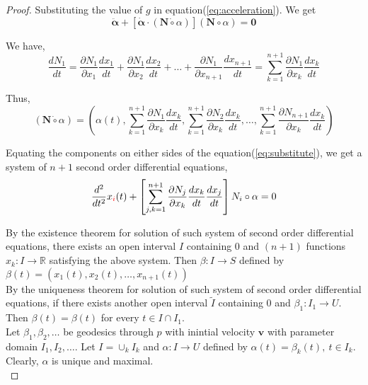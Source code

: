 \begin{proof}
	Substituting the value of $g$ in equation(\ref{eq:acceleration}). We get 
	\begin{equation}
		\ddot{\boldsymbol{\alpha}} + \left[ \dot{\boldsymbol{\alpha}} \cdot (\mathbf{N} \dot{\circ} \alpha) \right] (\mathbf{N} \circ \alpha) = \mathbf{0}
		\label{eq:substitute}
	\end{equation}

	We have,
	\begin{equation}
		\dfrac{dN_1}{dt} = \dfrac{\partial N_1}{\partial x_1} \dfrac{dx_1}{dt} +  \dfrac{\partial N_1}{\partial x_2} \dfrac{dx_2}{dt} + \dots + \dfrac{\partial N_1}{\partial x_{n+1}} \dfrac{dx_{n+1}}{dt} = \sum_{k=1}^{n+1} \dfrac{\partial N_1}{\partial x_k} \dfrac{dx_k}{dt}
	\end{equation}

	Thus,
	\begin{equation}
		(\mathbf{N} \dot{\circ} \alpha) = \left( \alpha(t), \sum_{k=1}^{n+1} \dfrac{\partial N_1}{\partial x_k} \dfrac{dx_k}{dt}, \sum_{k=1}^{n+1} \dfrac{\partial N_2}{\partial x_k} \dfrac{dx_k}{dt}, \dots, \sum_{k=1}^{n+1} \dfrac{\partial N_{n+1}}{\partial x_k} \dfrac{dx_k}{dt} \right)
	\end{equation}

	Equating the components on either sides of the equation(\ref{eq:substitute}), we get a system of $n+1$ second order differential equations,
	\begin{equation}
		\dfrac{d^2}{dt^2}x_{\color{red}i}(t) + \left[ \sum_{j,k=1}^{n+1} \dfrac{\partial N_j}{\partial x_k} \dfrac{dx_k}{dt}\dfrac{dx_j}{dt}\right] N_i \circ \alpha = 0
	\end{equation}

	By the existence theorem for solution of such system of second order differential equations, there exists an open interval $I$ containing $0$ and $(n+1)$ functions $x_k : I \to \mathbb{R}$ satisfying the above system. Then $\beta : I \to S$ defined by $\beta(t) = \left( x_1(t),x_2(t),\dots,x_{n+1}(t) \right)$\\

	By the uniqueness theorem for solution of such system of second order differential equations, if there exists another open interval $\tilde{I}$ containing $0$ and $\beta_1 : I_1 \to U$. Then $\beta(t) = \beta(t)$ for every $t \in I \cap I_1$.\\

	Let $\beta_1,\beta_2,\dots$ be geodesics through $p$ with inintial velocity $\mathbf{v}$ with parameter domain $I_1,I_2,\dots$. Let $I = \cup_k I_k$ and $\alpha : I \to U$ defined by $\alpha(t) = \beta_k(t),\ t \in I_k$. Clearly, $\alpha$ is unique and maximal.\\


\end{proof}
